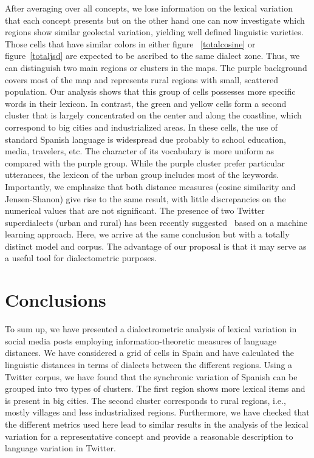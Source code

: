 \documentclass[11pt]{article}
\begin{document}
After averaging over all concepts, we lose information on the lexical variation that each concept presents but on the other hand one
can now investigate which regions show similar geolectal variation, yielding well defined linguistic varieties.
Those cells that have similar colors in either figure ~\ref{totalcosine} or figure~\ref{totaljsd} are expected to be ascribed to the same
dialect zone. Thus, we can distinguish two main regions or clusters in the maps. The purple background covers most of the map
and represents rural regions with small, scattered population. Our analysis shows that this group of cells possesses
more specific words in their lexicon. In contrast, the green and yellow cells form a second cluster that is largely concentrated
on the center and along the coastline, which correspond to big cities and industrialized areas. In these cells,
the use of standard Spanish language is widespread due probably to school education, media, travelers, etc.
The character of its vocabulary is more uniform as compared with the purple group. While the purple cluster
prefer particular utterances, the lexicon of the urban group includes most of the keywords.
Importantly, we emphasize that both distance measures (cosine similarity and Jensen-Shanon)
give rise to the same result, with little discrepancies on the numerical values that are not significant.
The presence of two Twitter superdialects (urban and rural) has been recently suggested~\cite{BD}
based on a machine learning approach. Here, we arrive at the same conclusion but with a totally distinct model and corpus.
The advantage of our proposal is that it may serve as a useful tool for dialectometric purposes.

\section{Conclusions}
To sum up, we have presented a dialectrometric analysis of lexical variation in social media posts
employing information-theoretic measures of language distances. We have considered a grid of cells in Spain and have calculated
the linguistic distances in terms of dialects between the different regions.
Using a Twitter corpus, we have found that the synchronic variation of Spanish can be grouped into two types of clusters. The first region shows more lexical items and is present in big cities. The second cluster corresponds to rural regions, i.e., mostly villages and less industrialized regions. Furthermore, we have checked that the different metrics used here lead to similar results in the analysis of the lexical variation for a representative concept and provide a reasonable description to language variation in Twitter.
\end{document}
